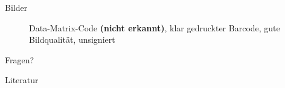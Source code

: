\documentclass{beamer}
\begin{document}
\begin{frame}{Bilder}
\begin{figure}
      \caption{Data-Matrix-Code \textbf{(nicht erkannt)}, klar gedruckter Barcode, gute Bildqualität, unsigniert}
    \end{figure}
  \end{frame}

  \begin{frame}[standout]
    Fragen?
  \end{frame}

  \appendix
  
  \begin{frame}[allowframebreaks]{Literatur}
    
    
  \end{frame}
  
\end{document}
